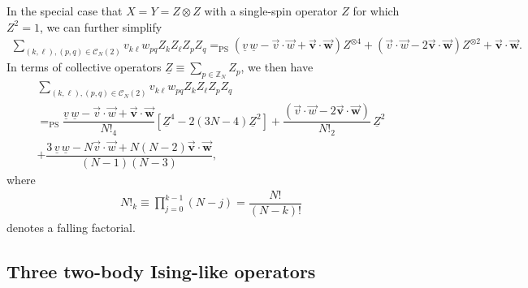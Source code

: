 \documentclass[nofootinbib,notitlepage,11pt]{revtex4-2}
\newcommand{\f}[2]{\dfrac{#1}{#2}} %
\newcommand{\p}[1]{\left(#1\right)} %
\renewcommand{\sp}[1]{\left[#1\right]} %
\renewcommand{\c}{\cdot} %
\newcommand{\m}{\bm} %
\renewcommand{\v}{\vec} %
\newcommand{\1}{\mathds{1}}
\newcommand{\C}{\mathcal{C}}
\newcommand{\ZZ}{\mathbb{Z}}
\newcommand{\EQPS}{=_{\text{PS}}}
\newcommand{\col}{\underline}
\begin{document}
In the special case that $X=Y=Z\otimes Z$ with a single-spin operator
$Z$ for which $Z^2=1$, we can further simplify
\begin{align}
  \sum_{\p{k,\ell},\p{p,q}\in\C_N\p{2}} v_{k\ell} w_{pq}
  Z_k Z_\ell Z_p Z_q
  \EQPS \p{\col{v}\,\col{w} -\v v\c\v w + \v{\m v}\c\v{\m w}}
  Z^{\otimes 4}
  + \p{\v v\c\v w - 2 \v{\m v} \c \v{\m w}} Z^{\otimes 2}
  + \v{\m v}\c\v{\m w}.
\end{align}
In terms of collective operators
$\col{Z} \equiv \sum_{p\in\ZZ_N} Z_p$, we then have
\begin{multline}
  \sum_{\p{k,\ell},\p{p,q}\in\C_N\p{2}} v_{k\ell} w_{pq}
  Z_k Z_\ell Z_p Z_q \\
  \EQPS \f{\col{v}\,\col{w} -\v v\c\v w + \v{\m v}\c\v{\m w}}{N!_4}
  \sp{\col{Z}^4 - 2\p{3N-4} \col{Z}^2}
  + \f{\p{\v v\c\v w - 2 \v{\m v} \c \v{\m w}}}{N!_2}\, \col{Z}^2 \\
  + \f{3\,\col{v}\,\col{w} - N \v v\c\v w + N\p{N-2}\v{\m v}\c\v{\m
      w}}{\p{N-1}\p{N-3}},
\end{multline}
where
\begin{align}
  N!_k \equiv \prod_{j=0}^{k-1} \p{N-j} = \f{N!}{\p{N-k}!}
\end{align}
denotes a falling factorial.

\subsection{Three two-body Ising-like operators}
\end{document}
